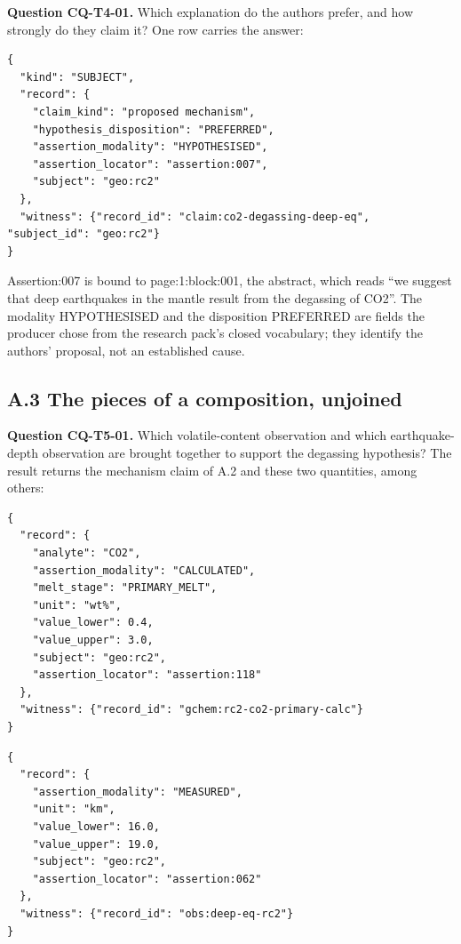 \par\medskip
\noindent\begin{minipage}{\linewidth}
\textbf{Question CQ-T4-01.} Which explanation do the authors prefer, and how strongly do they claim it? One row carries the answer:

\begin{lstlisting}
{
  "kind": "SUBJECT",
  "record": {
    "claim_kind": "proposed mechanism",
    "hypothesis_disposition": "PREFERRED",
    "assertion_modality": "HYPOTHESISED",
    "assertion_locator": "assertion:007",
    "subject": "geo:rc2"
  },
  "witness": {"record_id": "claim:co2-degassing-deep-eq", "subject_id": "geo:rc2"}
}
\end{lstlisting}
\end{minipage}\par\medskip

Assertion:007 is bound to page:1:block:001, the abstract, which reads “we suggest that deep earthquakes in the mantle result from the degassing of CO2”. The modality HYPOTHESISED and the disposition PREFERRED are fields the producer chose from the research pack's closed vocabulary; they identify the authors' proposal, not an established cause.

\subsection*{A.3 The pieces of a composition, unjoined}

\par\medskip
\noindent\begin{minipage}{\linewidth}
\textbf{Question CQ-T5-01.} Which volatile-content observation and which earthquake-depth observation are brought together to support the degassing hypothesis? The result returns the mechanism claim of A.2 and these two quantities, among others:

\begin{lstlisting}
{
  "record": {
    "analyte": "CO2",
    "assertion_modality": "CALCULATED",
    "melt_stage": "PRIMARY_MELT",
    "unit": "wt%",
    "value_lower": 0.4,
    "value_upper": 3.0,
    "subject": "geo:rc2",
    "assertion_locator": "assertion:118"
  },
  "witness": {"record_id": "gchem:rc2-co2-primary-calc"}
}
\end{lstlisting}
\end{minipage}\par\medskip

\par\medskip
\noindent\begin{minipage}{\linewidth}


\begin{lstlisting}
{
  "record": {
    "assertion_modality": "MEASURED",
    "unit": "km",
    "value_lower": 16.0,
    "value_upper": 19.0,
    "subject": "geo:rc2",
    "assertion_locator": "assertion:062"
  },
  "witness": {"record_id": "obs:deep-eq-rc2"}
}
\end{lstlisting}
\end{minipage}\par\medskip

